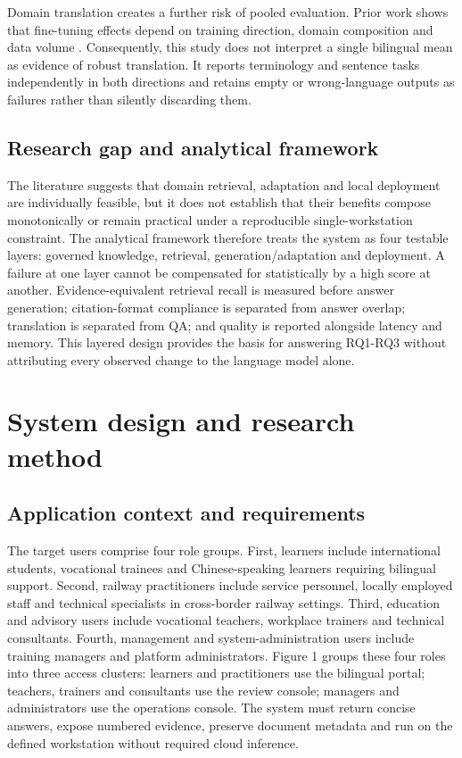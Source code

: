 Domain translation creates a further risk of pooled evaluation. Prior work shows that fine-tuning effects depend on training direction, domain composition and data volume \citep{hu2024translation,vieira2024translation,zheng2024translation}. Consequently, this study does not interpret a single bilingual mean as evidence of robust translation. It reports terminology and sentence tasks independently in both directions and retains empty or wrong-language outputs as failures rather than silently discarding them.

\subsection{Research gap and analytical framework}

The literature suggests that domain retrieval, adaptation and local deployment are individually feasible, but it does not establish that their benefits compose monotonically or remain practical under a reproducible single-workstation constraint. The analytical framework therefore treats the system as four testable layers: governed knowledge, retrieval, generation/adaptation and deployment. A failure at one layer cannot be compensated for statistically by a high score at another. Evidence-equivalent retrieval recall is measured before answer generation; citation-format compliance is separated from answer overlap; translation is separated from QA; and quality is reported alongside latency and memory. This layered design provides the basis for answering RQ1-RQ3 without attributing every observed change to the language model alone.

\section{System design and research method}

\subsection{Application context and requirements}

The target users comprise four role groups. First, learners include international students, vocational trainees and Chinese-speaking learners requiring bilingual support. Second, railway practitioners include service personnel, locally employed staff and technical specialists in cross-border railway settings. Third, education and advisory users include vocational teachers, workplace trainers and technical consultants. Fourth, management and system-administration users include training managers and platform administrators. Figure 1 groups these four roles into three access clusters: learners and practitioners use the bilingual portal; teachers, trainers and consultants use the review console; managers and administrators use the operations console. The system must return concise answers, expose numbered evidence, preserve document metadata and run on the defined workstation without required cloud inference.

